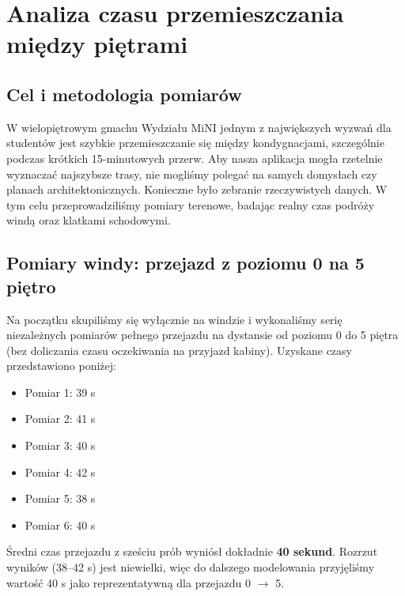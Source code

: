 \documentclass{article}
\begin{document}
\setcounter{section}{3}
\section{Analiza czasu przemieszczania między \mbox{piętrami}}

\subsection{Cel i metodologia pomiarów}
W wielopiętrowym gmachu Wydziału MiNI jednym z największych wyzwań dla studentów jest szybkie przemieszczanie się między kondygnacjami, szczególnie podczas krótkich 15-minutowych przerw. Aby nasza aplikacja mogła rzetelnie wyznaczać najszybsze trasy, nie mogliśmy polegać na samych domysłach czy planach architektonicznych. Konieczne było zebranie rzeczywistych danych. W tym celu przeprowadziliśmy pomiary terenowe, badając realny czas podróży windą oraz klatkami schodowymi.

\subsection{Pomiary windy: przejazd z poziomu 0 na 5 piętro}
Na początku skupiliśmy się wyłącznie na windzie i wykonaliśmy serię niezależnych pomiarów pełnego przejazdu na dystansie od poziomu 0 do 5 piętra (bez doliczania czasu oczekiwania na przyjazd kabiny). Uzyskane czasy przedstawiono poniżej:
\begin{itemize}
    \item Pomiar 1: 39 s
    \item Pomiar 2: 41 s
    \item Pomiar 3: 40 s
    \item Pomiar 4: 42 s
    \item Pomiar 5: 38 s
    \item Pomiar 6: 40 s
\end{itemize}

Średni czas przejazdu z sześciu prób wyniósł dokładnie \textbf{40 sekund}. Rozrzut wyników (38--42 s) jest niewielki, więc do dalszego modelowania przyjęliśmy wartość 40 s jako reprezentatywną dla przejazdu 0 $\rightarrow$ 5.
\end{document}
